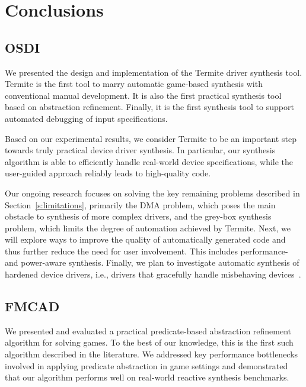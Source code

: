 \chapter{Conclusions}

\section{OSDI}

We presented the design and implementation of the Termite driver 
synthesis tool.  Termite is the first tool to marry automatic 
game-based synthesis with conventional manual development.  It is 
also the first practical synthesis tool based on abstraction 
refinement.  Finally, it is the first synthesis tool to support 
automated debugging of input specifications. 

Based on our experimental results, we consider Termite to 
be an important step towards truly practical device driver 
synthesis.  In particular, our synthesis algorithm is able to 
efficiently handle real-world device specifications, while the 
user-guided approach reliably leads to high-quality code.


Our ongoing research focuses on solving the key remaining problems 
described in Section~\ref{s:limitations}, primarily the DMA 
problem, which poses the main obstacle to synthesis of more 
complex drivers, and the grey-box synthesis problem, which limits 
the degree of automation achieved by Termite.  Next, we will 
explore ways to improve the quality of automatically generated 
code and thus further reduce the need for user involvement.  This 
includes performance- and power-aware synthesis.  Finally, we plan 
to investigate automatic synthesis of hardened device drivers, 
i.e., drivers that gracefully handle misbehaving 
devices~\cite{Kadav_RS_09}.

\section{FMCAD}

We presented and evaluated a practical predicate-based abstraction 
refinement algorithm for solving games.  To the best of our 
knowledge, this is the first such algorithm described in the 
literature.  We addressed key performance bottlenecks involved in 
applying predicate abstraction in game settings and demonstrated 
that our algorithm performs well on real-world reactive synthesis 
benchmarks. 
